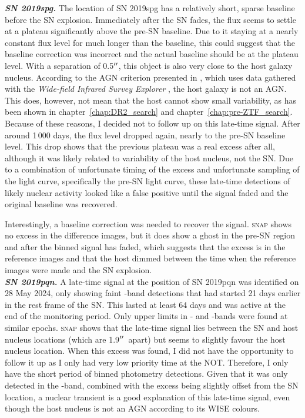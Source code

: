 \documentclass[a4paper,oneside,12pt, class=Latex/Classes/PhDthesisPSnPDF, crop=false]{standalone}
\begin{document}
\textit{\textbf{SN 2019spg.}}
The location of SN 2019spg has a relatively short, sparse baseline before the SN explosion. Immediately after the SN fades, the flux seems to settle at a plateau significantly above the pre-SN baseline. Due to it staying at a nearly constant flux level for much longer than the baseline, this could suggest that the baseline correction was incorrect and the actual baseline should be at the plateau level. With a separation of 0.5$^{\prime\prime}$, this object is also very close to the host galaxy nucleus. According to the AGN criterion presented in \citet{WISE_crit}, which uses data gathered with the \textit{Wide-field Infrared Survey Explorer} \citep[WISE,][]{WISE}, the host galaxy is not an AGN. This does, however, not mean that the host cannot show small variability, as has been shown in chapter~\ref{chap:DR2_search} and chapter~\ref{chap:pre-ZTF_search}. Because of these reasons, I decided not to follow up on this late-time signal. After around 1\,000 days, the flux level dropped again, nearly to the pre-SN baseline level. This drop shows that the previous plateau was a real excess after all, although it was likely related to variability of the host nucleus, not the SN. Due to a combination of unfortunate timing of the excess and unfortunate sampling of the light curve, specifically the pre-SN light curve, these late-time detections of likely nuclear activity looked like a false positive until the signal faded and the original baseline was recovered.

Interestingly, a baseline correction was needed to recover the signal. \textsc{snap} shows no excess in the difference images, but it does show a ghost in the pre-SN region and after the binned signal has faded, which suggests that the excess is in the reference images and that the host dimmed between the time when the reference images were made and the SN explosion.\\


\textit{\textbf{SN 2019pqn.}}
A late-time signal at the position of SN 2019pqn was identified on 28 May 2024, only showing faint \ztfg-band detections that had started 21 days earlier in the rest frame of the SN. This lasted at least 64 days and was active at the end of the monitoring period. Only upper limits in \ztfr- and \ztfi-bands were found at similar epochs. \textsc{snap} shows that the late-time signal lies between the SN and host nucleus locations (which are 1.9$^{\prime\prime}$\ apart) but seems to slightly favour the host nucleus location. When this excess was found, I did not have the opportunity to follow it up as I only had very low priority time at the NOT. Therefore, I only have the short period of binned photometry detections. Given that it was only detected in the \ztfg-band, combined with the excess being slightly offset from the SN location, a nuclear transient is a good explanation of this late-time signal, even though the host nucleus is not an AGN according to its WISE colours.
\end{document}

